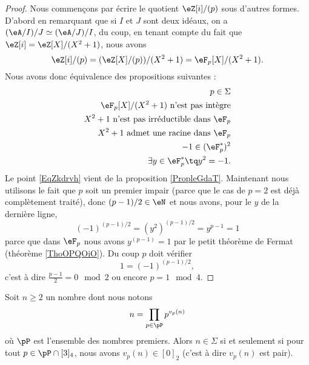 \begin{proof}
    Nous commençons par écrire le quotient \( \eZ[i]/(p)\) sous d'autres formes. D'abord en remarquant que si \( I\) et \( J\) sont deux idéaux, on a \( (\eA/I)/J\simeq (\eA/J)/I\), du coup, en tenant compte du fait que \( \eZ[i]=\eZ[X]/(X^2+1)\), nous avons
    \begin{equation}
        \eZ[i]/(p)=(\eZ[X]/(p))/(X^2+1)=\eF_p[X]/(X^2+1).
    \end{equation}
    Nous avons donc équivalence des propositions suivantes :
    \begin{subequations}
        \begin{align}
            p\in\Sigma\\
            \eF_p[X]/(X^2+1)\text{ n'est pas intègre}\\
            X^2+1\text{ n'est pas irréductible dans } \eF_p \label{EqZkdrvh}\\
             X^2+1\text{ admet une racine dans } \eF_p\\
            -1\in (\eF_p^*)^2\\
            \exists y\in \eF_p^*\tq y^2=-1.
        \end{align}
    \end{subequations}
    Le point \eqref{EqZkdrvh} vient de la proposition \ref{PropleGdaT}. Maintenant nous utilisons le fait que \( p\) soit un premier impair (parce que le cas de \( p=2\) est déjà complètement traité), donc \( (p-1)/2\in \eN\) et nous avons, pour le \( y\) de la dernière ligne,
    \begin{equation}
        (-1)^{(p-1)/2}=(y^2)^{(p-1)/2}=y^{p-1}=1
    \end{equation}
    parce que dans \( \eF_p\) nous avons \( y^{(p-1)}=1\) par le petit théorème de Fermat (théorème \ref{ThoOPQOiO}). Du coup \( p\) doit vérifier
    \begin{equation}
        1=(-1)^{(p-1)/2},
    \end{equation}
    c'est à dire \( \frac{ p-1 }{2}=0\mod 2\) ou encore \( p=1\mod 4\).
\end{proof}

\begin{theorem}
    Soit \( n\geq 2\) un nombre dont nous notons
    \begin{equation}    \label{EqBMHTzCT}
        n=\prod_{p\in\pP}p^{v_p(n)}
    \end{equation}
    où \( \pP\) est l'ensemble des nombres premiers. Alors \( n\in \Sigma\) si et seulement si pour tout \( p\in\pP\cap[3]_4\), nous avons \( v_p(n)\in [0]_2\) (c'est à dire \( v_p(n)\) est pair).
\end{theorem}

